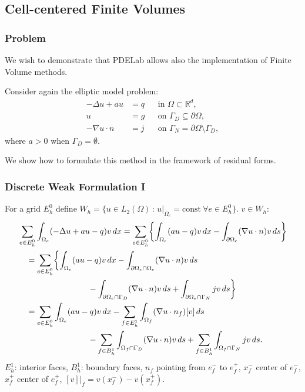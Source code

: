 \subsection{Cell-centered Finite Volumes}

\begin{frame}
\frametitle{Problem}
We wish to demonstrate that PDELab allows also the implementation of Finite Volume methods.

Consider again the elliptic model problem:
\begin{subequations} \label{Eq:Example04}
\begin{align*}
 -\Delta u + a u  &= q &&\text{in $\Omega\subset\mathbb{R}^d$},\\
                u &= g &&\text{on $\Gamma_D\subseteq\partial\Omega$},\\
-\nabla u \cdot n &= j &&\text{on $\Gamma_N=\partial\Omega\setminus\Gamma_D$},
\end{align*}
\end{subequations}
where $a>0$ when $\Gamma_D=\emptyset$.

We show how to formulate this method in the framework of residual forms.
\end{frame}

\begin{frame}
\frametitle{Discrete Weak Formulation I}
For a grid $E_h^0$ define $W_h = \{ u \in L_2(\Omega) \,:\, 
u|_{\Omega_e} = \text{const} \ \forall e\in E_h^0\}$. $v\in W_h$:
\begin{equation*}
\begin{split}
& \sum_{e\in E_h^0} \int_{\Omega_e} (-\Delta u + au - q) v \, dx = 
\sum_{e\in E_h^0} \biggl\{ \int_{\Omega_e} (au - q) v \, dx - 
\int_{\partial\Omega_e} (\nabla u\cdot n) v \, ds \biggr\}\\
&\quad = \sum_{e\in E_h^0} \biggl\{ \int_{\Omega_e} (au - q) v \, dx
- \int_{\partial\Omega_e\cap\Omega_e} (\nabla u\cdot n) v \, ds\\
&\hspace{30mm} - \int_{\partial\Omega_e\cap\Gamma_D} (\nabla u\cdot n) v \, ds
+ \int_{\partial\Omega_e\cap\Gamma_N} j v \, ds \biggr\}\\
&\quad = \sum_{e\in E_h^0} \int_{\Omega_e} (au - q) v \, dx
- \sum_{f\in E_h^1} \int_{\Omega_f} (\nabla u\cdot n_f) [v] \, ds\\
&\hspace{30mm} - \sum_{f\in B_h^1} \int_{\Omega_f\cap\Gamma_D} (\nabla u\cdot n) v \, ds
+ \sum_{f\in B_h^1} \int_{\Omega_f\cap\Gamma_N} j v \, ds .
\end{split}
\end{equation*}
$E_h^1$: interior faces, $B_h^1$: boundary faces, $n_f$ pointing from $e^-_f$ to $e^+_f$,
$x_f^-$ center of $e_f^-$, $x_f^+$ center of $e_f^+$, $[v]|_f = v(x_f^-) - v(x_f^+)$.
\end{frame}



